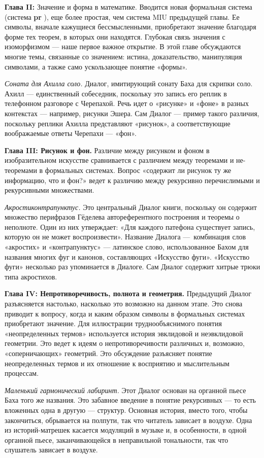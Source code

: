 \textbf{Глава II:} Значение и форма в математике. Вводится новая формальная система (система \textbf{pr} ), еще более простая, чем система MIU предыдущей главы. Ее символы, вначале кажущиеся бессмысленными, приобретают значение благодаря форме тех теорем, в которых они находятся. Глубокая связь значения с изоморфизмом --- наше первое важное открытие. В этой главе обсуждаются многие темы, связанные со значением: истина, доказательство, манипуляция символами, а также само ускользающее понятие «формы».

\emph{Соната для Ахилла соло.} Диалог, имитирующий сонату Баха для скрипки соло. Ахилл --- единственный собеседник, поскольку это запись его реплик в телефонном разговоре с Черепахой. Речь идет о «рисунке» и «фоне» в разных контекстах --- например, рисунки Эшера. Сам Диалог --- пример такого различия, поскольку реплики Ахилла представляют «рисунок», а соответствующие воображаемые ответы Черепахи --- «фон».

\textbf{Глава III: Рисунок и фон.} Различие между рисунком и фоном в изобразительном искусстве сравнивается с различием между теоремами и не-теоремами в формальных системах. Вопрос «содержит ли рисунок ту же информацию, что и фон?» ведет к различию между рекурсивно перечислимыми и рекурсивными множествами.

\emph{Акростиконтрапунктус.} Это центральный Диалог книги, поскольку он содержит множество перифразов Гёделева автореферентного построения и теоремы о неполноте. Один из них утверждает: «Для каждого патефона существует запись, которую он не может воспроизвести». Название Диалога ---~комбинация слов «акростих» и «контрапунктус» --- латинское слово, использованное Бахом для названия многих фуг и канонов, составляющих «Искусство фуги». «Искусство фуги» несколько раз упоминается в Диалоге. Сам Диалог содержит хитрые трюки типа акростихов.

\textbf{Глава IV: Непротиворечивость, полнота и геометрия.} Предыдущий Диалог разъясняется настолько, насколько это возможно на данном этапе. Это снова приводит к вопросу, когда и каким образом символы в формальных системах приобретают значение. Для иллюстрации труднообъяснимого понятия «неопределенных термов» используется история эвклидовой и неэвклидовой геометрии. Это ведет к идеям о непротиворечивости различных и, возможно, «соперничающих» геометрий. Это обсуждение разъясняет понятие неопределенных термов и их отношение к восприятию и мыслительным процессам.

\emph{Маленький гармонический лабиринт.} Этот Диалог основан на органной пьесе Баха того же названия. Это забавное введение в понятие рекурсивных --- то есть вложенных одна в другую --- структур. Основная история, вместо того, чтобы закончиться, обрывается на полпути, так что читатель зависает в воздухе. Одна из историй-матрешек касается модуляций в музыке и, в особенности, в одной органной пьесе, заканчивающейся в неправильной тональности, так что слушатель зависает в воздухе.

